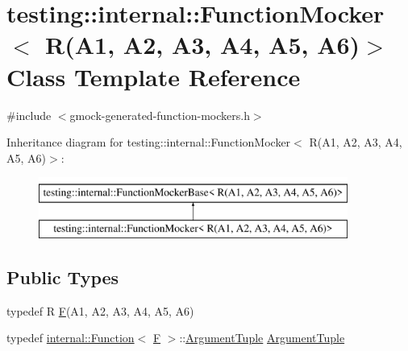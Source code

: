 \hypertarget{classtesting_1_1internal_1_1FunctionMocker_3_01R_07A1_00_01A2_00_01A3_00_01A4_00_01A5_00_01A6_08_4}{}\section{testing\+::internal\+::Function\+Mocker$<$ R(A1, A2, A3, A4, A5, A6)$>$ Class Template Reference}
\label{classtesting_1_1internal_1_1FunctionMocker_3_01R_07A1_00_01A2_00_01A3_00_01A4_00_01A5_00_01A6_08_4}


{\ttfamily \#include $<$gmock-\/generated-\/function-\/mockers.\+h$>$}

Inheritance diagram for testing\+::internal\+::Function\+Mocker$<$ R(A1, A2, A3, A4, A5, A6)$>$\+:\begin{figure}[H]
\begin{center}
\leavevmode
\includegraphics[height=2.000000cm]{classtesting_1_1internal_1_1FunctionMocker_3_01R_07A1_00_01A2_00_01A3_00_01A4_00_01A5_00_01A6_08_4}
\end{center}
\end{figure}
\subsection*{Public Types}
\begin{DoxyCompactItemize}
\item 
typedef R \mbox{\hyperlink{classtesting_1_1internal_1_1FunctionMocker_3_01R_07A1_00_01A2_00_01A3_00_01A4_00_01A5_00_01A6_08_4_a5373cd66051f0a54e83b0497004df058}{F}}(A1, A2, A3, A4, A5, A6)
\item 
typedef \mbox{\hyperlink{structtesting_1_1internal_1_1Function}{internal\+::\+Function}}$<$ \mbox{\hyperlink{classtesting_1_1internal_1_1FunctionMocker_3_01R_07A1_00_01A2_00_01A3_00_01A4_00_01A5_00_01A6_08_4_a5373cd66051f0a54e83b0497004df058}{F}} $>$\+::\mbox{\hyperlink{classtesting_1_1internal_1_1FunctionMocker_3_01R_07A1_00_01A2_00_01A3_00_01A4_00_01A5_00_01A6_08_4_a0c8bc671adc8e67e8a49a01432407139}{Argument\+Tuple}} \mbox{\hyperlink{classtesting_1_1internal_1_1FunctionMocker_3_01R_07A1_00_01A2_00_01A3_00_01A4_00_01A5_00_01A6_08_4_a0c8bc671adc8e67e8a49a01432407139}{Argument\+Tuple}}
\end{DoxyCompactItemize}
